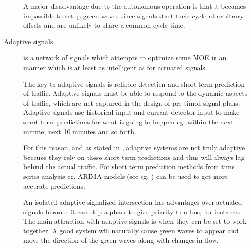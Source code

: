 \begin{description}
A major disadvantage due to the autonomous operation is that it becomes impossible to setup green waves since signals start their cycle at arbitrary offsets and are unlikely to share a common cycle time.

\item[Adaptive signals] is a network of signals which attempts to optimize some MOE in an manner which is at least as intelligent as for actuated signals. 

The key to adaptive signals is reliable detection and short term prediction of traffic. Adaptive signals must be able to respond to the dynamic aspects of traffic, which are not captured in the design of pre-timed signal plans. Adaptive signals use historical input and current detector input to make short term predictions for what is going to happen eg. within the next minute, next 10 minutes and so forth. 

For this reason, and as stated in \cite{1}, adaptive systems are not truly adaptive because they rely on these short term predictions and thus will always lag behind the actual traffic. For short term prediction methods from time series analysis eg. ARIMA models (see eg. \cite{shortpredict}) can be used to get more accurate predictions.

An isolated adaptive signalized intersection has advantages over actuated signals because it can skip a phase to give priority to a bus, for instance. The main attraction with adaptive signals is when they can be set to work together. A good system will naturally cause green waves to appear and move the direction of the green waves along with changes in flow.
\end{description}